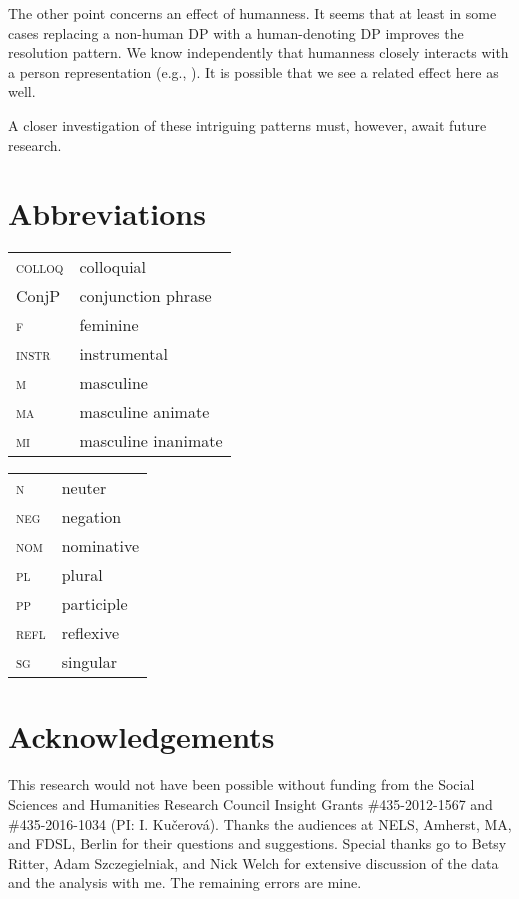 \documentclass[output=paper,modfontsnewtxmath,hidelinks]{langscibook}
\begin{document}
The other point concerns an effect of humanness. It seems that at least in some cases replacing  a non-human  DP with a human-denoting  DP improves the resolution pattern. We know independently that humanness closely interacts with a person representation (e.g., \citealt{Ritter2014, Wiltschko2015}). It is possible that we see a related effect here as well.

A closer investigation of these intriguing patterns must, however, await future research.


\section*{Abbreviations}

\begin{tabularx}{.5\textwidth}{@{}lQ@{}}
\textsc{colloq}&colloquial\\
ConjP&{conjunction phrase}\\
\textsc{f}&{feminine}\\
\textsc{instr}&{instrumental}\\
\textsc{m}&{masculine}\\
\textsc{ma}&{masculine} {animate}\\
\textsc{mi}&{masculine} {inanimate}\\
\end{tabularx}%
\begin{tabularx}{.5\textwidth}{@{}lQ@{}}
\textsc{n}&{neuter}\\
\textsc{neg}&{negation}\\
\textsc{nom}&{nominative}\\
\textsc{pl}&{plural}\\
\textsc{pp}&{participle}\\
\textsc{refl}&reflexive\\
\textsc{sg}&singular\\
\end{tabularx}

\section*{Acknowledgements}
This research would not have been possible without funding from the Social Sciences and Humanities Research Council Insight Grants \#435-2012-1567 and \#435-2016-1034  (PI: I. Kučerová). Thanks the audiences at NELS, Amherst, MA, and FDSL, Berlin for their questions and suggestions. Special thanks go to Betsy Ritter, Adam Szczegielniak, and Nick Welch for extensive discussion of the data and the analysis with me. The remaining errors are mine.

\sloppy
\printbibliography[heading=subbibliography,notkeyword=this]
\clearpage 
\end{document}
